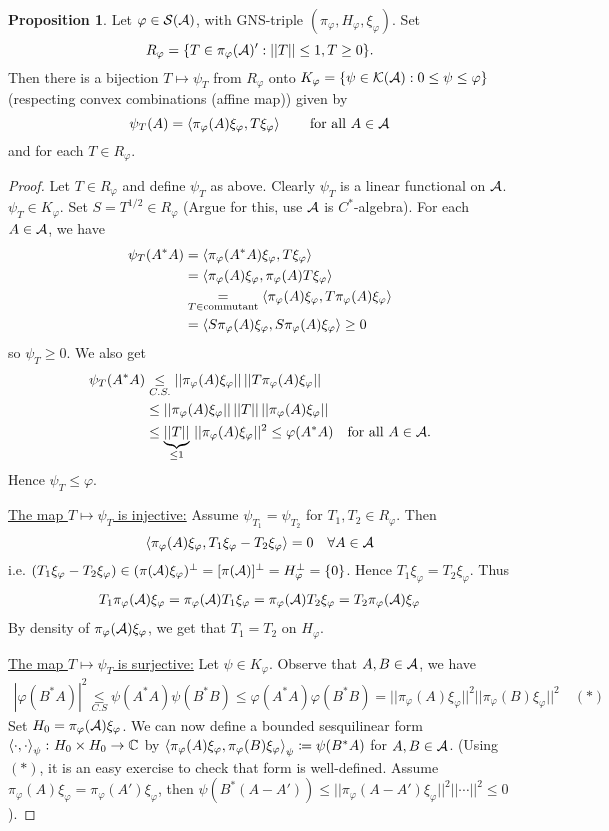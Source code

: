 \documentclass[10pt,english,a4paper]{article}
\theoremstyle{definition}
\newtheorem*{proposition}{Proposition}
\def\pivp{\pi_{\vphi}}
\def\Hvp{H_{\vphi}}
\def\xivp{\xi_{\vphi}}
\def\vphi{\varphi}
\begin{document}
\begin{proposition}
    Let $\vphi \in \Ss(\As)$, with GNS-triple $(\pivp, \Hvp, \xivp)$.
Set 
\[R_{\vphi} = \{ T \in \pivp(\As)' : ||T||\leq 1, T \geq 0 \}.\] 
Then there is a bijection $T \mapsto \psi_{T}$ from $R_{\vphi}$ onto
$K_{\vphi} = \{\psi \in \Ks(\As) : 0\leq \psi\leq \vphi\}$
(respecting convex combinations (affine map)) given by
\[ \psi_{T}(A) = \ind{\pivp(A)\xivp, T\xivp}\qquad\text{for all } A \in \As \]
and for each $T \in R_{\vphi}$.
\end{proposition}
\begin{proof}
    Let $T \in R_{\vphi}$ and define $\psi_T$ as above. Clearly $\psi_{T}$
is a linear functional on $\mathcal{A}$. $\psi_T \in K_{\vphi}$. 
Set $S = T^{1/2} \in R_{\vphi}$ (Argue for this, use $\mathcal{A}$ is $C^*$-algebra).
For each $A \in \mathcal{A}$, we have 
\begin{align*}
\psi_T(A^*A) &= \ind{\pivp(A^*A)\xivp, T\xivp} \\
    &= \ind{\pivp(A)\xivp, \pivp(A)T\xivp} \\
&\underset{T\in\text{commutant}}{=} \ind{\pivp(A)\xivp, T\pivp(A)\xivp}\\
&= \ind{S\pivp(A)\xivp, S\pivp(A)\xivp} \geq 0
\end{align*}
so $\psi_T \geq 0$.
We also get 
\begin{align*}
    \psi_T(A^*A) &\underset{C.S.}{\leq} ||\pivp(A)\xivp|| \,||T\pivp(A)\xivp|| \\
&\leq ||\pivp(A)\xivp|| \,||T|| \,||\pivp(A)\xivp|| \\
&\leq \ub{||T||}_{\leq 1} \,||\pivp(A)\xivp||^2 \leq \vphi(A^*A)\quad\text{for all }A\in\As.
\end{align*}
Hence $\psi_T\leq \vphi$.

\ul{The map $T\mapsto \psi_T$ is injective:}
Assume $\psi_{T_1} = \psi_{T_2}$ for $T_1,T_2 \in R_{\vphi}$. Then 
\[ \ind{\pivp(A)\xivp, T_1\xivp-T_2\xivp} = 0 \quad \forall A\in \As\]
i.e. $(T_1\xivp - T_2\xivp) \in (\pi(\As)\xivp)^{\perp} = [\pi(\As)]^{\perp} =
\Hvp^{\perp}=\{0\}$.
Hence $T_1\xivp = T_{2}\xivp$. 
Thus 
\begin{align*}
    T_1\pivp(\As)\xivp = \pivp(\As)T_1\xivp = \pivp (\As)T_2 \xivp = T_2\pivp(\As)\xivp
\end{align*}
By density of $\pivp(\As)\xivp$, we get that $T_1 = T_2$ on $H_{\vphi}$.

\ul{The map $T\mapsto \psi_{T}$ is surjective:}
Let $\psi \in K_{\vphi}$. Observe that $A,B \in \mathcal{A}$, we have 
\begin{align*}
    |\vphi(B^*A)|^2 \underset{C.S}{\leq} \psi(A^*A)\psi(B^*B)\leq \vphi(A^*A)\vphi(B^*B) 
= ||\pivp(A)\xivp||^2 ||\pivp(B)\xivp||^2 \quad (*)
\end{align*}
Set $H_0 = \pivp(\As)\xivp$. We can now define a bounded sesquilinear form 
$\left\langle \cdot,\cdot \right\rangle_{\psi} \colon H_0\times H_0 \to \mathbb{C}$ by 
$\ind{\pivp(A)\xivp, \pivp(B)\xivp}_{\psi}\coloneqq \psi(B^*A)$
 for $A,B \in \mathcal{A}$.
(Using $(*)$, it is an easy exercise to check that form is well-defined. Assume
$\pivp(A)\xivp = \pivp(A')\xivp$, then $\psi(B^*(A-A'))\leq
||\pivp(A-A')\xivp||^2||\cdots||^2\leq 0$).


\end{proof}
\end{document}
